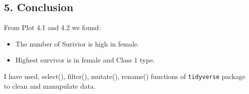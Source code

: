 \documentclass[
]{article}
\providecommand{\tightlist}{%
  \setlength{\itemsep}{0pt}\setlength{\parskip}{0pt}}
\begin{document}
\hypertarget{conclusion}{%
\subsection{5. Conclusion}\label{conclusion}}

From Plot 4.1 and 4.2 we found:

\begin{itemize}
\tightlist
\item
  The number of Surivior is high in female.
\item
  Highest survivor is in female and Class 1 type.
\end{itemize}

I have used, select(), filter(), mutate(), rename() functions of
\texttt{tidyverse} package to clean and manupulate data.
\end{document}
